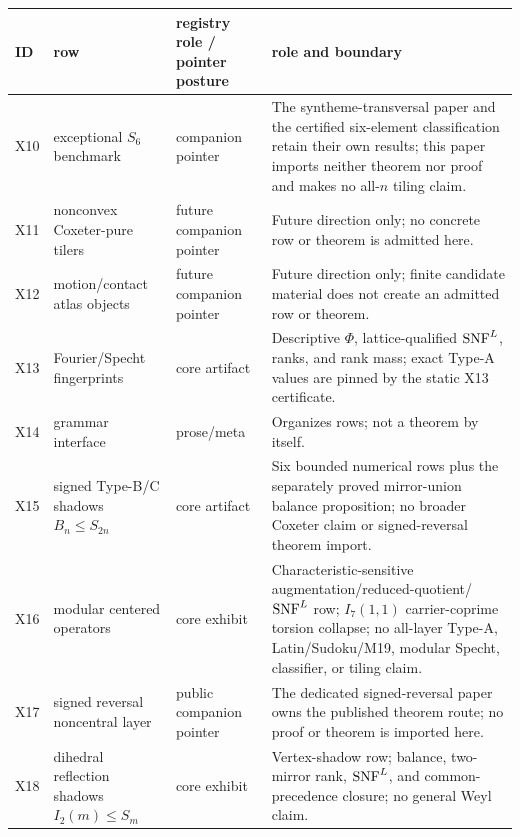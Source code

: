 \begin{center}
\begin{tabular}{@{}L{0.07\textwidth}L{0.30\textwidth}L{0.18\textwidth}L{0.36\textwidth}@{}}
\toprule
ID & row & registry role / pointer posture & role and boundary \\
\midrule
X10 & exceptional \(S_6\) benchmark & companion pointer & The syntheme-transversal paper and the certified six-element classification retain their own results; this paper imports neither theorem nor proof and makes no all-\(n\) tiling claim. \\
X11 & nonconvex Coxeter-pure tilers & future companion pointer & Future direction only; no concrete row or theorem is admitted here. \\
X12 & motion/contact atlas objects & future companion pointer & Future direction only; finite candidate material does not create an admitted row or theorem. \\
X13 & Fourier/Specht fingerprints & core artifact & Descriptive \(\Phi\), lattice-qualified \(\operatorname{SNF}^{L}\), ranks, and rank mass; exact Type-A values are pinned by the static X13 certificate. \\
X14 & grammar interface & prose/meta & Organizes rows; not a theorem by itself. \\
X15 & signed Type-B/C shadows \(B_n\leq S_{2n}\) & core artifact & Six bounded numerical rows plus the separately proved mirror-union balance proposition; no broader Coxeter claim or signed-reversal theorem import. \\
X16 & modular centered operators & core exhibit & Characteristic-sensitive augmentation/reduced-quotient/\(\operatorname{SNF}^{L}\) row; \(I_7(1,1)\) carrier-coprime torsion collapse; no all-layer Type-A, Latin/Sudoku/M19, modular Specht, classifier, or tiling claim. \\
X17 & signed reversal noncentral layer & public companion pointer & The dedicated signed-reversal paper owns the published theorem route; no proof or theorem is imported here. \\
X18 & dihedral reflection shadows \(I_2(m)\leq S_m\) & core exhibit & Vertex-shadow row; balance, two-mirror rank, \(\operatorname{SNF}^{L}\), and common-precedence closure; no general Weyl claim. \\
\bottomrule
\end{tabular}\end{center}

